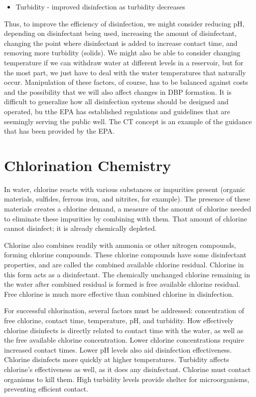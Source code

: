 \documentclass[10pt]{article}
\begin{document}
\begin{itemize}
  \item Turbidity - improved disinfection as turbidity decreases
\end{itemize}
Thus, to improve the efficiency of disinfection, we might consider reducing $\mathrm{pH}$, depending on disinfectant being used, increasing the amount of disinfectant, changing the point where disinfectant is added to increase contact time, and removing more turbidity (solids). We might also be able to consider changing temperature if we can withdraw water at different levels in a reservoir, but for the most part, we just have to deal with the water temperatures that naturally occur. Manipulation of these factors, of course, has to be balanced against costs and the possibility that we will also affect changes in DBP formation. It is difficult to generalize how all disinfection systems should be designed and operated, bu tthe EPA has established regulations and guidelines that are seemingly serving the public well. The CT concept is an example of the guidance that has been provided by the EPA.

\section{Chlorination Chemistry}
In water, chlorine reacts with various substances or impurities present (organic materials, sulfides, ferrous iron, and nitrites, for example). The presence of these materials creates a chlorine demand, a measure of the amount of chlorine needed to eliminate these impurities by combining with them. That amount of chlorine cannot disinfect; it is already chemically depleted.

Chlorine also combines readily with ammonia or other nitrogen compounds, forming chlorine compounds. These chlorine compounds have some disinfectant properties, and are called the combined available chlorine residual. Chlorine in this form acts as a disinfectant. The chemically unchanged chlorine remaining in the water after combined residual is formed is free available chlorine residual. Free chlorine is much more effective than combined chlorine in disinfection.

For successful chlorination, several factors must be addressed: concentration of free chlorine, contact time, temperature, pH, and turbidity. How effectively chlorine disinfects is directly related to contact time with the water, as well as the free available chlorine concentration. Lower chlorine concentrations require increased contact times. Lower pH levels also aid disinfection effectiveness. Chlorine disinfects more quickly at higher temperatures. Turbidity affects chlorine's effectiveness as well, as it does any disinfectant. Chlorine must contact organisms to kill them. High turbidity levels provide shelter for microorganisms, preventing efficient contact.
\end{document}
